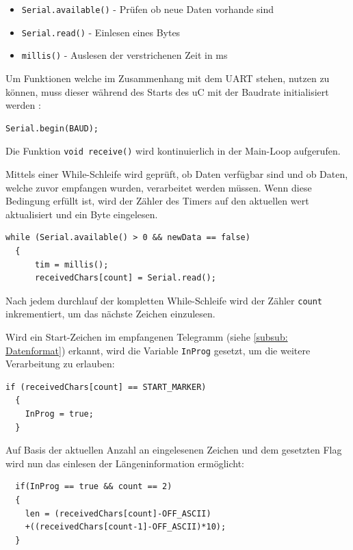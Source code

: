 \begin{itemize}
  \item \lstinline!Serial.available()! - Prüfen ob neue Daten vorhande sind
  \item \lstinline!Serial.read()! - Einlesen eines Bytes 
  \item \lstinline!millis()! - Auslesen der verstrichenen Zeit in ms
\end{itemize}

Um Funktionen welche im Zusammenhang mit dem \ac{UART} stehen, nutzen zu können, muss dieser während des Starts des \ac{uC} mit der Baudrate initialisiert werden \citep{ArduinoRef}:
\begin{lstlisting}[caption={\textit{Initialiserung UART}}]
  Serial.begin(BAUD);
\end{lstlisting}

Die Funktion \lstinline!void receive()! wird kontinuierlich in der Main-Loop aufgerufen.

\smallskip


Mittels einer While-Schleife wird geprüft, ob Daten verfügbar sind und ob Daten, welche zuvor empfangen wurden, verarbeitet werden müssen. Wenn diese Bedingung erfüllt
ist, wird der Zähler des Timers auf den aktuellen wert aktualisiert und ein Byte eingelesen. 

\begin{lstlisting}[caption={\textit{Prüfen auf neue Daten}}]
  while (Serial.available() > 0 && newData == false)
  {
      tim = millis();
      receivedChars[count] = Serial.read();
\end{lstlisting}

Nach jedem durchlauf der kompletten While-Schleife wird der Zähler \lstinline!count! inkrementiert, um das nächste Zeichen einzulesen.

\newpage

Wird ein Start-Zeichen im empfangenen Telegramm (siehe \ref{subsub: Datenformat}) erkannt, wird die Variable \lstinline!InProg! gesetzt, um die weitere Verarbeitung
zu erlauben:

\begin{lstlisting}[caption={\textit{Erkennung Start-Marker}}]
  if (receivedChars[count] == START_MARKER)
  {
    InProg = true;
  }
\end{lstlisting}

Auf Basis der aktuellen Anzahl an eingelesenen Zeichen und dem gesetzten Flag wird nun das einlesen der Längeninformation ermöglicht:

\begin{lstlisting}
  if(InProg == true && count == 2)
  {
    len = (receivedChars[count]-OFF_ASCII)
    +((receivedChars[count-1]-OFF_ASCII)*10);
  }
\end{lstlisting}

